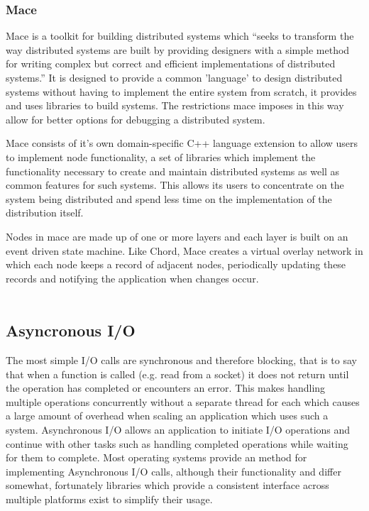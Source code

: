 \documentclass{article}
\begin{document}
\subsubsection{Mace} 
Mace\cite{mace} is a toolkit for building distributed systems which “seeks to transform the way distributed systems are built by providing designers with a simple method for writing complex but correct and efficient implementations of distributed systems.” \cite{mace_quote} It is designed to provide a common 'language' to design distributed systems without having to implement the entire system from scratch, it provides and uses libraries to build systems. The restrictions mace imposes in this way allow for better options for debugging a distributed system.

Mace consists of it's own domain-specific C++ language extension to allow users to implement node functionality, a set of libraries which implement the functionality necessary to create and maintain distributed systems as well as common features for such systems. This allows its users to concentrate on the system being distributed and spend less time on the implementation of the distribution itself.

Nodes in mace are made up of one or more layers and each layer is built on an event driven state machine. Like Chord, Mace creates a virtual overlay network in which each node keeps a record of adjacent nodes, periodically updating these records and notifying the application when changes occur.
\\
\\

\subsection{Asyncronous I/O}

The most simple I/O calls are synchronous and therefore blocking, that is to say that when a function is called (e.g. read from a socket) it does not return until the operation has completed or encounters an error. This makes handling multiple operations concurrently without a separate thread for each which causes a large amount of overhead when scaling an application which uses such a system. Asynchronous I/O allows an application to initiate I/O operations and continue with other tasks such as handling completed operations while waiting for them to complete. Most operating systems provide an method for implementing Asynchronous I/O calls, although their functionality and differ somewhat, fortunately libraries which provide a consistent interface across multiple platforms exist to simplify their usage.
\end{document}
